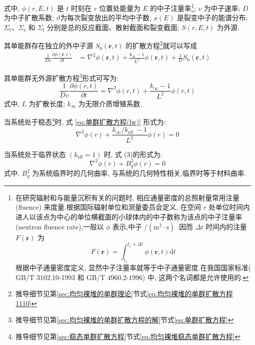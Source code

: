 \documentclass{Sichuan Normal University}
\begin{document}
式中, $\phi(r, E, t)$ 是 $t$ 时刻在 $r$ 位置处能量为 $E$ 的中子注量率\footnote{在研究辐射和与能量沉积有关的问题时, 相应通量密度的总照射量常用注量 (fluence) 来度量.根据国际辐射单位和测量委员会定义, 在空间 $r$ 处单位时间内进人以该点为中心的单位横截面的小球体内的中子数称为该点的中子注量率 (neutron fluence rate),一般以 $\phi$ 表示,中子 $/\left(\mathrm{m}^2 \cdot \mathrm{s}\right)$ .因而 $\Delta t$ 时间内的注量 $F(\boldsymbol{r})$ 为
$$
F(\boldsymbol{r})=\int_{t_1}^{t_1+\Delta t} \phi(\boldsymbol{r}, t) \mathrm{d} t
$$
根据中子通量密度定义, 显然中子注量率就等于中子通量密度.在我国国家标准( GB/T 3102.10-1993 和 GB/T 4960.2-1996) 中, 这两个名词都是允许使用的.}; $v$ 为中子速率; $D$ 为中子扩散系数; $\vartheta$为每次裂变放出的平均中子数; $x(E)$ 是裂变中子的能谱分布; $\Sigma_{\mathrm{t}} 、 \Sigma_{\mathrm{s}}$ 和 $\Sigma_{\mathrm{f}}$ 分别是总的反应截面、散射截面和裂变截面; $S(r, E, t)$ 为外源.

其单能群存在独立的外中子源 $S_0(\boldsymbol{r}, t)$ 的扩散方程\footnote{推导细节见第\ref{sec:均匀裸堆的单群理论}节式\eqref{eq:均匀裸堆的单群扩散方程1110}}就可以写成
\begin{align}
\frac{1}{Dv} \frac{\partial \phi(\boldsymbol{r}, t)}{\partial t}&=\nabla^2 \phi(\boldsymbol{r}, t)+\frac{k_{\infty}-1}{L^2} \phi(\boldsymbol{r}, t)+\frac{1}{D}S_0(\boldsymbol{r}, t)
\end{align}

其单能群无外源扩散方程\footnote{推导细节见第\ref{sec:均匀裸堆的单群扩散方程的解}节式\eqref{eq:单群扩散方程}}形式可写为:
\begin{equation}
\frac{1}{D v} \frac{\partial \phi(r, t)}{\partial t}=\nabla^2 \phi(r, t)+\frac{k_{\infty}-1}{L^2} \phi(r, t)
\label{eq:单群扩散方程(lw)}
\end{equation}
式中, $L$ 为扩散长度; $k_{\infty}$ 为无限介质增殖系数.

当系统处于稳态\footnote{推导细节见第\ref{sec:稳态单群扩散方程}节式\eqref{eq:均匀裸堆稳态单群扩散方程}}时, 式 \eqref{eq:单群扩散方程(lw)} 形式为:
\begin{equation}
\nabla^2 \phi(r)+\frac{k_{\infty} / k_{\text {eff }}-1}{L^2} \phi(r)=0
\label{eq:均匀裸堆稳态单群扩散方程(lw)}
\end{equation}

当系统处于临界状态 $\left(k_{\mathrm{eff}}=1\right)$ 时, 式 (3)的形式为:
\begin{equation}
\nabla^2 \phi(r)+B_g^2 \phi(r)=0
\label{eq:均匀裸堆稳态单群扩散方程2(lw)}
\end{equation}
式中, $B_g^2$ 为系统临界时的几何曲率, 与系统的几何特性相关,临界时等于材料曲率.
\end{document}
